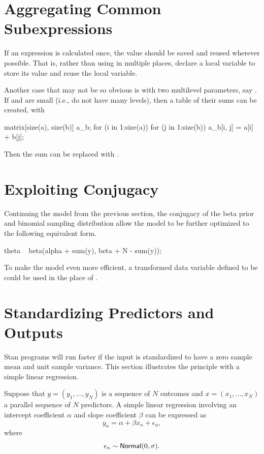 \section{Aggregating Common Subexpressions}

If an expression is calculated once, the value should be saved and
reused wherever possible.  That is, rather than using
 in multiple places, declare a local variable to
store its value and reuse the local variable.  

Another case that may not be so obvious is with two multilevel
parameters, say .  If  and 
are small (i.e., do not have many levels), then a table  of
their sums can be created, with
%
\begin{stancode}
matrix[size(a), size(b)] a_b;
for (i in 1:size(a))
  for (j in 1:size(b))
    a_b[i, j] = a[i] + b[j];
\end{stancode}
%
Then the sum can be replaced with .


\section{Exploiting Conjugacy}


Continuing the model from the previous section, the conjugacy of the
beta prior and binomial sampling distribution allow the model to be
further optimized to the following equivalent form.
%
\begin{stancode}
    theta ~ beta(alpha + sum(y), beta + N - sum(y));
\end{stancode}
%
To make the model even more efficient, a transformed data variable
defined to be  could be used in the place of .

\section{Standardizing Predictors and Outputs}

Stan programs will run faster if the input is standardized to have a
zero sample mean and unit sample variance.  This section illustrates
the principle with a simple linear regression.

Suppose that $y = (y_1,\ldots,y_N)$ is a sequence of $N$ outcomes and
$x = (x_1,\ldots,x_N)$ a parallel sequence of $N$ predictors.  A
simple linear regression involving an intercept coefficient $\alpha$
and slope coefficient $\beta$ can be expressed as
\[
y_n = \alpha + \beta x_n + \epsilon_n,
\]
where
\[
\epsilon_n \sim \distro{Normal}(0,\sigma).
\]

